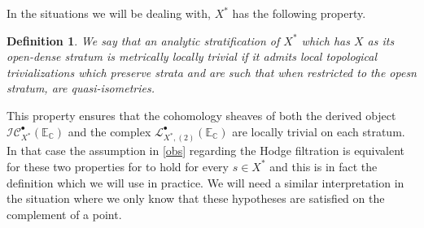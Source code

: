 \documentclass[12pt,letterpaper]{amsart}
\numberwithin{equation}{section}
\def\CC{{\mathbb C}}
\def\EE{{\mathbb E}}
\def\Iscr{{\mathscr I}}
\def\Lscr{{\mathscr L}}
\def\Cscr{{\mathscr C}}
\def\pt{{\scriptscriptstyle\bullet}}
\newtheorem{definition}{Definition}\numberwithin{definition}{section}
\theoremstyle{remark}
\begin{document}
In the situations we will be dealing with, $X^*$ has the following property. 

\begin{definition}\label{def:mettrivial}
We say that an analytic stratification of $X^*$ which has $X$ as its  open-dense stratum is \emph{metrically locally trivial}
if it admits local  topological trivializations  which preserve strata and  are such that when restricted to the opesn stratum,  are quasi-isometries.
\end{definition}

This property ensures that the cohomology sheaves of both the derived object $\Iscr\Cscr_{X^*}^\pt(\EE_\CC)$ and the complex $\Lscr^\pt_{{X^*},(2)}(\EE_\CC)$  are locally  trivial on each stratum. In that case the  assumption in  \ref{obs} regarding the Hodge filtration is equivalent for these two properties for  to hold for every $s\in X^*$ and 
this is in fact the definition which we will use in practice. We will need  a similar  interpretation in the situation where we only know that these hypotheses are satisfied on the complement of a point.
\end{document}
